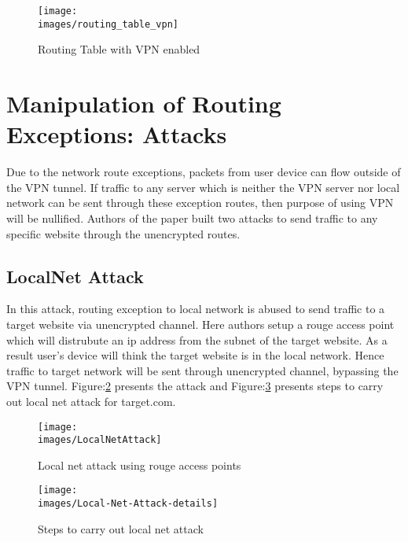 \documentclass[letterpaper,11pt]{article}
\newcommand{\images}{images}
\newcommand{\fig}{Figure:}
\begin{document}
\begin{figure}[h]
	\centering
	\texttt{[image: \\images/routing\_table\_vpn]}
	\caption{Routing Table with VPN enabled}
	\label{fig:routing}
\end{figure}

\section{Manipulation of Routing Exceptions: Attacks}
Due to the network route exceptions, packets from user device can flow outside of the VPN tunnel.
If traffic to any server which is neither the VPN server nor local network can be sent through these exception routes,
then purpose of using VPN will be nullified. Authors of the paper \cite{vpnleaks} built two attacks to send traffic to any specific website through the unencrypted routes.

\subsection{LocalNet Attack} In this attack, routing exception to local network is abused to send traffic to a target website via unencrypted channel. Here authors setup a rouge access point which will distrubute an ip address from the subnet of the target website.
As a result user's device will think the target website is in the local network. Hence traffic to target network will be sent through unencrypted channel, bypassing the VPN tunnel. \fig \ref{fig:localnet} presents the attack and \fig \ref{fig:localnetdetails} presents steps to carry out local net attack for target.com.

\begin{figure*}[h]
	\centering
	\begin{subfigure}{0.42\textwidth}
		\centering
		\texttt{[image: \\images/LocalNetAttack]}
		\caption{Local net attack using rouge access points}
		\label{fig:localnet}
	\end{subfigure}
	\begin{subfigure}{0.56\textwidth}
		\centering
		\texttt{[image: \\images/Local-Net-Attack-details]}
		\caption{Steps to carry out local net attack}
		\label{fig:localnetdetails}
	\end{subfigure}
	\caption{Formation of LocalNet Attack}
\end{figure*}
\end{document}
